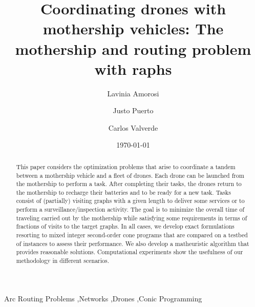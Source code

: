 \documentclass[10pt,a4paper]{elsarticle}
\title{Coordinating drones with mothership vehicles: The mothership and \EN{multiple-drone} routing problem with \EN{g}raphs}
\author[1]{Lavinia Amorosi\corref{cor1}}
\author[2]{Justo Puerto\corref{cor1}}
\author[2]{Carlos Valverde\corref{cor1}}
\date{\today}
\newcommand{\EN}[1]{{\color{black}#1}}
\begin{document}
\begin{abstract}
This paper considers the optimization problems that arise to coordinate a tandem between a mothership vehicle and a fleet of drones. 
Each drone can be launched from the mothership to perform a task. After completing the\EN{ir} tasks, the drones return to the mothership to recharge the\EN{ir} batteries and to be ready for a new task. Tasks consist o\EN{f} (partially) visiting graphs with a given length to deliver some services or to perform \EN{a} surveillance/inspection activity.  The goal is to minimize the overall time of \EN{traveling carried out} by the mothership while satisfying some requirements in terms of fractions of visits to the target graphs. In all cases, we develop exact formulations resorting to mixed integer second-order cone programs that are compared on a testbed of instances to assess their performance. We also develop a matheuristic algorithm that provides reasonable solutions.  Computational experiments show the usefulness of our methodology in different scenarios. 
\end{abstract}

\begin{keyword}
Arc Routing Problems \sep Networks \sep Drones \sep Conic Programming
\end{keyword}


\maketitle
\end{document}
